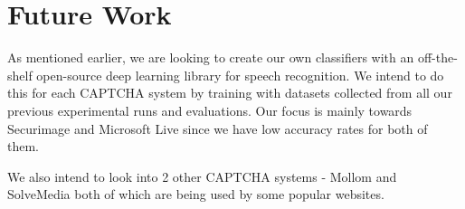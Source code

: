 \section{Future Work}
\label{sec:future}

As mentioned earlier, we are looking to create our own classifiers with an off-the-shelf open-source deep learning library for speech recognition. We intend to do this for each CAPTCHA system by training with datasets collected from all our previous experimental runs and evaluations. Our focus is mainly towards Securimage and Microsoft Live since we have low accuracy rates for both of them.\newline

We also intend to look into 2 other CAPTCHA systems - Mollom and SolveMedia both of which are being used by some popular websites.\newline